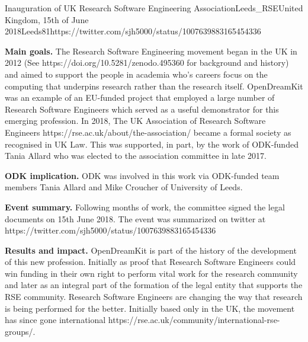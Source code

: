 \begin{event}{Inauguration of UK Research Software Engineering Association}{Leeds_RSE}{United Kingdom, 15th of June 2018}{Leeds}{8}{1}{https://twitter.com/sjh5000/status/1007639883165454336}

\textbf{Main goals.} The Research Software Engineering movement began in the UK in 2012 (See https://doi.org/10.5281/zenodo.495360 for background and history) and aimed to support the people in academia who's careers focus on the computing that underpins research rather than the research itself. OpenDreamKit was an example of an EU-funded project that employed a large number of Research Software Engineers which served as a useful demonstrator for this emerging profession. In 2018, The UK Association of Research Software Engineers https://rse.ac.uk/about/the-association/ became a formal society as recognised in UK Law. This was supported, in part, by the work of ODK-funded Tania Allard who was elected to the association committee in late 2017.

\textbf{ODK implication.} ODK was involved in this work via ODK-funded team members Tania Allard and Mike Croucher of University of Leeds.

\textbf{Event summary.} Following months of work, the committee signed the legal documents on 15th June 2018. The event was summarized on twitter at https://twitter.com/sjh5000/status/1007639883165454336

\textbf{Results and impact.} OpenDreamKit is part of the history of the development of this new profession. Initially as proof that Research Software Engineers could win funding in their own right to perform vital work for the research community and later as an integral part of the formation of the legal entity that supports the RSE community.  Research Software Engineers are changing the way that research is being performed for the better. Initially based only in the UK, the movement has since gone international https://rse.ac.uk/community/international-rse-groups/.

\end{event}
